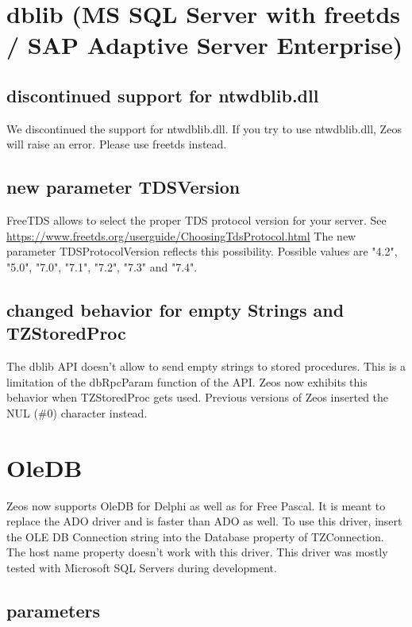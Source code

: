 \documentclass[a4paper,12pt,oneside]{article}
\begin{document}
\FloatBarrier
\section{dblib (MS SQL Server with freetds / SAP Adaptive Server Enterprise)}

\subsection{discontinued support for ntwdblib.dll}
We discontinued the support for ntwdblib.dll.
If you try to use ntwdblib.dll, Zeos will raise an error.
Please use freetds instead.

\subsection{new parameter TDSVersion}
FreeTDS allows to select the proper TDS protocol version for your server.
See \url{https://www.freetds.org/userguide/ChoosingTdsProtocol.html}
The new parameter TDSProtocolVersion reflects this possibility.
Possible values are "4.2", "5.0", "7.0", "7.1", "7.2", "7.3" and "7.4".

\subsection{changed behavior for empty Strings and TZStoredProc}
The dblib API doesn't allow to send empty strings to stored procedures.
This is a limitation of the dbRpcParam function of the API.
Zeos now exhibits this behavior when TZStoredProc gets used.
Previous versions of Zeos inserted the NUL (\#0) character instead.

\section{OleDB}
Zeos now supports OleDB for Delphi as well as for Free Pascal.
It is meant to replace the ADO driver and is faster than ADO as well.
To use this driver, insert the OLE DB Connection string into the Database property of TZConnection.
The host name property doesn't work with this driver.
This driver was mostly tested with Microsoft SQL Servers during development.

\subsection{parameters}
\end{document}
